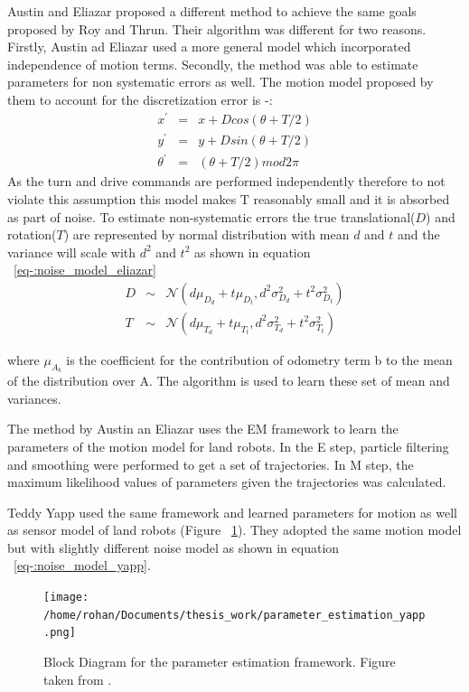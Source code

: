 \documentclass[12pt]{dalcsthesis}
\begin{document}
Austin and Eliazar \cite{Eliazar2004} proposed a different method to achieve the same goals proposed by Roy and Thrun. Their algorithm was different for two reasons. Firstly, Austin ad Eliazar used a more general model which incorporated independence of motion terms. Secondly, the method was able to estimate parameters for non systematic errors as well. 
The motion model proposed by them to account for the discretization error is -:
\begin{equation}
	\begin{aligned}
	x^{'}&=&x+Dcos(\theta+T/2) \\
	y^{'}&=&y+Dsin(\theta+T/2) \\
	\theta^{'}&=&(\theta+T/2)mod2\pi
	\end{aligned}
\end{equation}
As the turn and drive commands are performed independently therefore to not violate this assumption this model makes T reasonably small and it is absorbed as part of noise. To estimate non-systematic errors the true translational($D$) and rotation($T$) are represented by normal distribution with mean $d$ and $t$ and the variance will scale with $d^2$ and $t^2$ as shown in equation ~\ref{eq-:noise_model_eliazar}
\begin{equation}
\label{eq-:noise_model_eliazar}
\begin{aligned}
D &\sim& \mathcal{{N}}(d\mu_{D_{d}}+t\mu_{D_{t}},d^2\sigma_{D_{d}}^2+t^2\sigma_{D_{t}}^2)\\
T &\sim& \mathcal{{N}}(d\mu_{T_{d}}+t\mu_{T_{t}},d^2\sigma_{T_{d}}^2+t^2\sigma_{T_{t}}^2)
\end{aligned}
\end{equation}

where $\mu_{A_{b}}$ is the coefficient for the contribution of odometry term b to the mean of the distribution over A. The algorithm is used to learn these set of mean and variances.

The method by Austin an Eliazar uses the EM framework to learn the parameters of the motion model for land robots. In the E step, particle filtering and smoothing were performed to get a set of trajectories. In M step, the maximum likelihood values of parameters given the trajectories was calculated.

Teddy Yapp \cite{Yap2008} used the same framework and learned parameters for motion as well as sensor model of land robots (Figure ~\ref{fig-parameter_estimation Yapp}). They adopted the same motion model but with slightly different noise model as shown in equation ~\ref{eq-:noise_model_yapp}.
\begin{figure}
  \centering
     {\texttt{[image: /home/rohan/Documents/thesis\_work/parameter\_estimation\_yapp.png]}}
  \caption{\label{fig-parameter_estimation Yapp} Block Diagram for the parameter estimation framework. Figure taken from \cite{Yap2008}.}
\end{figure}
\end{document}

